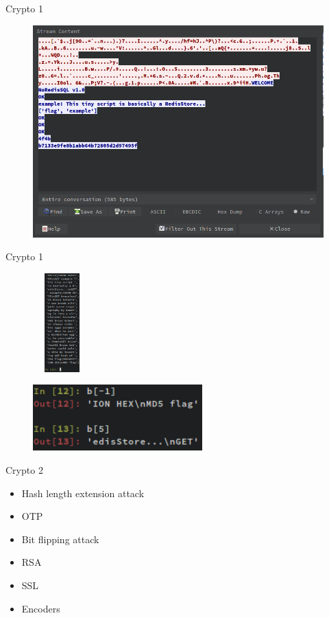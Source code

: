 \documentclass[compress]{beamer}
\begin{document}
\begin{frame}{Crypto 1}
	\begin{figure}
		\centering
		\includegraphics[width=\textwidth]{images/c11.png}
	\end{figure}
\end{frame}

\begin{frame}{Crypto 1}
	\begin{figure}
		\centering
		\includegraphics[width=0.2\textwidth,height=1.5in]{images/c13.png}
	\end{figure}
	\begin{figure}
		\centering
		\includegraphics[height=1in]{images/c14.png}
	\end{figure}    
\end{frame}

\begin{frame}{Crypto 2}

\begin{itemize}
	\item Hash length extension attack
    \item OTP
    \item Bit flipping attack
    \item RSA
    \item SSL
    \item Encoders
\end{itemize}

\end{frame}
\end{document}
